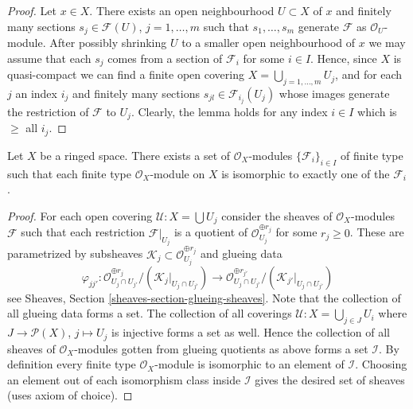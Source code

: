 \begin{proof}
Let $x \in X$. There exists an open neighbourhood
$U \subset X$ of $x$ and finitely many sections
$s_j \in \mathcal{F}(U)$, $j = 1, \ldots, m$ such that
$s_1, \ldots, s_m$ generate $\mathcal{F}$ as $\mathcal{O}_U$-module.
After possibly shrinking $U$ to a smaller open neighbourhood of $x$
we may assume that each $s_j$ comes from a section of $\mathcal{F}_i$
for some $i \in I$.
Hence, since $X$ is quasi-compact we can find a finite open
covering $X = \bigcup_{j = 1, \ldots, m} U_j$, and for each $j$
an index $i_j$ and finitely many sections $s_{jl} \in \mathcal{F}_{i_j}(U_j)$
whose images generate the restriction of $\mathcal{F}$ to
$U_j$. Clearly, the lemma holds for any index $i \in I$ which
is $\geq$ all $i_j$.
\end{proof}

\begin{lemma}
\label{lemma-set-isomorphism-classes-finite-type-modules}
Let $X$ be a ringed space.
There exists a set of $\mathcal{O}_X$-modules
$\{\mathcal{F}_i\}_{i \in I}$ of finite type
such that each finite type $\mathcal{O}_X$-module
on $X$ is isomorphic to exactly one of the $\mathcal{F}_i$.
\end{lemma}

\begin{proof}
For each open covering $\mathcal{U} : X = \bigcup U_j$ consider the
sheaves of $\mathcal{O}_X$-modules $\mathcal{F}$ such that each
restriction $\mathcal{F}|_{U_j}$ is a quotient of
$\mathcal{O}_{U_j}^{\oplus r_j}$ for some $r_j \geq 0$.
These are parametrized by subsheaves
$\mathcal{K}_j \subset \mathcal{O}_{U_j}^{\oplus r_j}$ and glueing
data
$$
\varphi_{jj'} :
\mathcal{O}_{U_j \cap U_{j'}}^{\oplus r_j}/
(\mathcal{K}_j|_{U_j \cap U_{j'}})
\longrightarrow
\mathcal{O}_{U_j \cap U_{j'}}^{\oplus r_{j'}}/
(\mathcal{K}_{j'}|_{U_j \cap U_{j'}})
$$
see Sheaves, Section \ref{sheaves-section-glueing-sheaves}.
Note that the collection of all glueing data forms a set.
The collection of all coverings $\mathcal{U} : X = \bigcup_{j \in J} U_i$
where $J \to \mathcal{P}(X)$, $j \mapsto U_j$ is injective forms a set as
well. Hence the collection of all sheaves of $\mathcal{O}_X$-modules
gotten from glueing quotients as above forms a set $\mathcal{I}$.
By definition every finite type $\mathcal{O}_X$-module
is isomorphic to an element of $\mathcal{I}$. Choosing an
element out of each isomorphism class inside $\mathcal{I}$
gives the desired set of sheaves (uses axiom of choice).
\end{proof}













